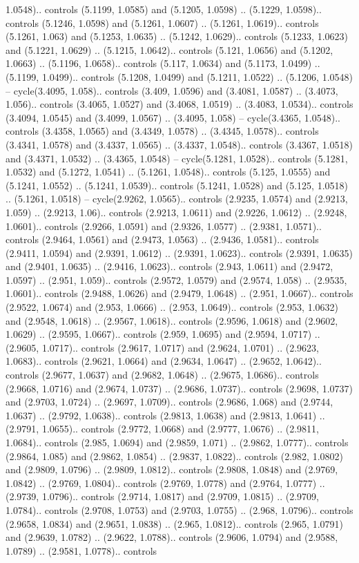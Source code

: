 1.0548).. controls (5.1199, 1.0585) and (5.1205, 1.0598) .. (5.1229, 1.0598).. controls (5.1246, 1.0598) and (5.1261, 1.0607) .. (5.1261, 1.0619).. controls (5.1261, 1.063) and (5.1253, 1.0635) .. (5.1242, 1.0629).. controls (5.1233, 1.0623) and (5.1221, 1.0629) .. (5.1215, 1.0642).. controls (5.121, 1.0656) and (5.1202, 1.0663) .. (5.1196, 1.0658).. controls (5.117, 1.0634) and (5.1173, 1.0499) .. (5.1199, 1.0499).. controls (5.1208, 1.0499) and (5.1211, 1.0522) .. (5.1206, 1.0548) -- cycle(3.4095, 1.058).. controls (3.409, 1.0596) and (3.4081, 1.0587) .. (3.4073, 1.056).. controls (3.4065, 1.0527) and (3.4068, 1.0519) .. (3.4083, 1.0534).. controls (3.4094, 1.0545) and (3.4099, 1.0567) .. (3.4095, 1.058) -- cycle(3.4365, 1.0548).. controls (3.4358, 1.0565) and (3.4349, 1.0578) .. (3.4345, 1.0578).. controls (3.4341, 1.0578) and (3.4337, 1.0565) .. (3.4337, 1.0548).. controls (3.4367, 1.0518) and (3.4371, 1.0532) .. (3.4365, 1.0548) -- cycle(5.1281, 1.0528).. controls (5.1281, 1.0532) and (5.1272, 1.0541) .. (5.1261, 1.0548).. controls (5.125, 1.0555) and (5.1241, 1.0552) .. (5.1241, 1.0539).. controls (5.1241, 1.0528) and (5.125, 1.0518) .. (5.1261, 1.0518) -- cycle(2.9262, 1.0565).. controls (2.9235, 1.0574) and (2.9213, 1.059) .. (2.9213, 1.06).. controls (2.9213, 1.0611) and (2.9226, 1.0612) .. (2.9248, 1.0601).. controls (2.9266, 1.0591) and (2.9326, 1.0577) .. (2.9381, 1.0571).. controls (2.9464, 1.0561) and (2.9473, 1.0563) .. (2.9436, 1.0581).. controls (2.9411, 1.0594) and (2.9391, 1.0612) .. (2.9391, 1.0623).. controls (2.9391, 1.0635) and (2.9401, 1.0635) .. (2.9416, 1.0623).. controls (2.943, 1.0611) and (2.9472, 1.0597) .. (2.951, 1.059).. controls (2.9572, 1.0579) and (2.9574, 1.058) .. (2.9535, 1.0601).. controls (2.9488, 1.0626) and (2.9479, 1.0648) .. (2.951, 1.0667).. controls (2.9522, 1.0674) and (2.953, 1.0666) .. (2.953, 1.0649).. controls (2.953, 1.0632) and (2.9548, 1.0618) .. (2.9567, 1.0618).. controls (2.9596, 1.0618) and (2.9602, 1.0629) .. (2.9595, 1.0667).. controls (2.959, 1.0695) and (2.9594, 1.0717) .. (2.9605, 1.0717).. controls (2.9617, 1.0717) and (2.9624, 1.0701) .. (2.9623, 1.0683).. controls (2.9621, 1.0664) and (2.9634, 1.0647) .. (2.9652, 1.0642).. controls (2.9677, 1.0637) and (2.9682, 1.0648) .. (2.9675, 1.0686).. controls (2.9668, 1.0716) and (2.9674, 1.0737) .. (2.9686, 1.0737).. controls (2.9698, 1.0737) and (2.9703, 1.0724) .. (2.9697, 1.0709).. controls (2.9686, 1.068) and (2.9744, 1.0637) .. (2.9792, 1.0638).. controls (2.9813, 1.0638) and (2.9813, 1.0641) .. (2.9791, 1.0655).. controls (2.9772, 1.0668) and (2.9777, 1.0676) .. (2.9811, 1.0684).. controls (2.985, 1.0694) and (2.9859, 1.071) .. (2.9862, 1.0777).. controls (2.9864, 1.085) and (2.9862, 1.0854) .. (2.9837, 1.0822).. controls (2.982, 1.0802) and (2.9809, 1.0796) .. (2.9809, 1.0812).. controls (2.9808, 1.0848) and (2.9769, 1.0842) .. (2.9769, 1.0804).. controls (2.9769, 1.0778) and (2.9764, 1.0777) .. (2.9739, 1.0796).. controls (2.9714, 1.0817) and (2.9709, 1.0815) .. (2.9709, 1.0784).. controls (2.9708, 1.0753) and (2.9703, 1.0755) .. (2.968, 1.0796).. controls (2.9658, 1.0834) and (2.9651, 1.0838) .. (2.965, 1.0812).. controls (2.965, 1.0791) and (2.9639, 1.0782) .. (2.9622, 1.0788).. controls (2.9606, 1.0794) and (2.9588, 1.0789) .. (2.9581, 1.0778).. controls 